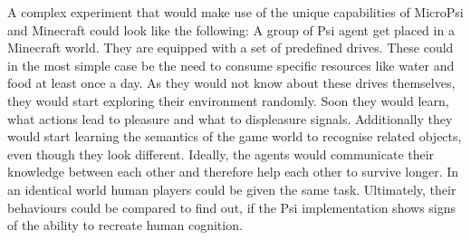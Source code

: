 A complex experiment that would make use of the unique capabilities of MicroPsi and Minecraft could look like the following:
A group of Psi agent get placed in a Minecraft world. They are equipped with a set of predefined drives. These could in the most simple case be the need to consume specific resources like water and food at least once a day. As they would not know about these drives themselves, they would start exploring their environment randomly. Soon they would learn, what actions lead to pleasure and what to displeasure signals. Additionally they would start learning the semantics of the game world to recognise related objects, even though they look different. Ideally, the agents would communicate their knowledge between each other and therefore help each other to survive longer. In an identical world human players could be given the same task. Ultimately, their behaviours could be compared to find out, if the Psi implementation shows signs of the ability to recreate human cognition.